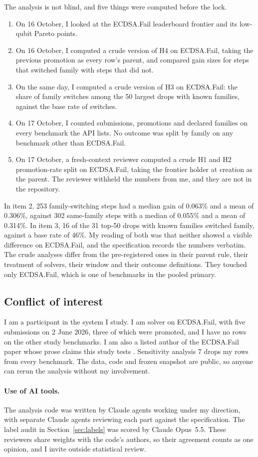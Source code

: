The analysis is not blind, and five things were computed before the lock.
\begin{enumerate}
  \item On 16 October, I looked at the ECDSA.Fail leaderboard frontier and its low-qubit Pareto points.
  \item On 16 October, I computed a crude version of H4 on ECDSA.Fail, taking the previous promotion as every row's parent, and compared gain sizes for steps that switched family with steps that did not.
  \item On the same day, I computed a crude version of H3 on ECDSA.Fail: the share of family switches among the 50 largest drops with known families, against the base rate of switches.
  \item On 17 October, I counted submissions, promotions and declared families on every benchmark the API lists. No outcome was split by family on any benchmark other than ECDSA.Fail.
  \item On 17 October, a fresh-context reviewer computed a crude H1 and H2 promotion-rate split on ECDSA.Fail, taking the frontier holder at creation as the parent. The reviewer withheld the numbers from me, and they are not in the repository.
\end{enumerate}
In item 2, 253 family-switching steps had a median gain of 0.063\% and a mean of 0.306\%, against 302 same-family steps with a median of 0.055\% and a mean of 0.314\%.
In item 3, 16 of the 31 top-50 drops with known families switched family, against a base rate of 46\%.
My reading of both was that neither showed a visible difference on ECDSA.Fail, and the specification records the numbers verbatim.
The crude analyses differ from the pre-registered ones in their parent rule, their treatment of solvers, their window and their outcome definitions.
They touched only ECDSA.Fail, which is one of \StudyK{} benchmarks in the pooled primary.

\subsection{Conflict of interest}
\label{sec:coi}

I am a participant in the system I study.
I am solver  on ECDSA.Fail, with five submissions on 2 June 2026, three of which were promoted, and I have no rows on the other study benchmarks.
I am also a listed author of the ECDSA.Fail paper whose prose claims this study tests \citep{long2026ecdsafail}.
Sensitivity analysis 7 drops my rows from every benchmark.
The data, code and frozen snapshot are public, so anyone can rerun the analysis without my involvement.

\paragraph{Use of AI tools.}
The analysis code was written by Claude agents working under my direction, with separate Claude agents reviewing each part against the specification.
The label audit in Section~\ref{sec:labels} was scored by Claude Opus~5.5.
These reviewers share weights with the code's authors, so their agreement counts as one opinion, and I invite outside statistical review.

